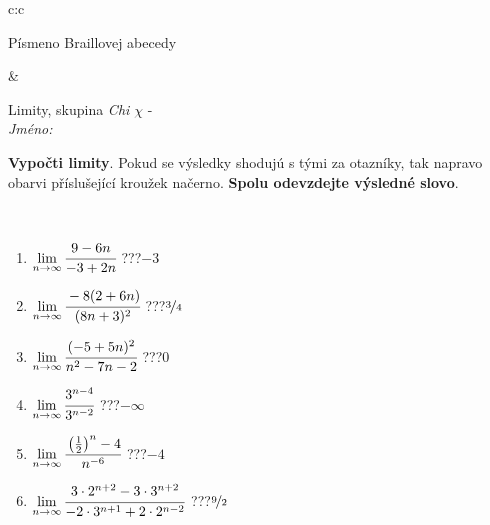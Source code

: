 \documentclass[10pt]{report}
\begin{document}
\begin{tabular}{c:c}
\begin{minipage}[c][104.5mm][t]{0.5\linewidth}
\begin{center}
\begin{minipage}{0.20\linewidth}
\begin{center}
{\small Písmeno Braillovej abecedy}
\end{center}
\end{minipage}
\end{center}
\end{minipage}
&
\begin{minipage}[c][104.5mm][t]{0.5\linewidth}
\begin{center}
\vspace{7mm}
{\huge Limity, skupina \textit{Chi $\chi$} -}\\[5mm]
\textit{Jméno:}\phantom{xxxxxxxxxxxxxxxxxxxxxxxxxxxxxxxxxxxxxxxxxxxxxxxxxxxxxxxxxxxxxxxxx}\\[5mm]
\begin{minipage}{0.95\linewidth}
\begin{center}
\textbf{Vypočti limity}. Pokud se výsledky shodujú s tými za otazníky, tak napravo\\obarvi příslušející kroužek načerno. \textbf{Spolu odevzdejte výsledné slovo}.
\end{center}
\end{minipage}
\\[1mm]
\begin{minipage}{0.79\linewidth}
\begin{center}
\begin{varwidth}{\linewidth}
\begin{enumerate}
\normalsize
\item $\lim\limits_{n\to\infty}\cfrac{9-6n}{-3+2n}$\quad \dotfill\; ???\;\dotfill \quad $-3$
\item $\lim\limits_{n\to\infty}\cfrac{-8(2+6n)}{(8n+3)^2}$\quad \dotfill\; ???\;\dotfill \quad $\nicefrac{3}{4}$
\item $\lim\limits_{n\to\infty}\cfrac{(-5+5n)^2}{n^2-7n-2}$\quad \dotfill\; ???\;\dotfill \quad $0$
\item $\lim\limits_{n\to\infty}\cfrac{3^{n-4}}{3^{n-2}}$\quad \dotfill\; ???\;\dotfill \quad $-\infty$
\item $\lim\limits_{n\to\infty}\cfrac{\left(\frac{1}{2}\right)^n -4}{n^{-6}}$\quad \dotfill\; ???\;\dotfill \quad $-4$
\item $\lim\limits_{n\to\infty}\cfrac{3\cdot 2^{n+2}-3\cdot 3^{n+2}}{-2\cdot 3^{n+1}+2\cdot 2^{n-2}}$\quad \dotfill\; ???\;\dotfill \quad $\nicefrac{9}{2}$
\end{enumerate}
\end{varwidth}
\end{center}
\end{minipage}
\begin{minipage}{0.20\linewidth}

\end{minipage}
\end{center}
\end{minipage}
\end{tabular}
\end{document}
